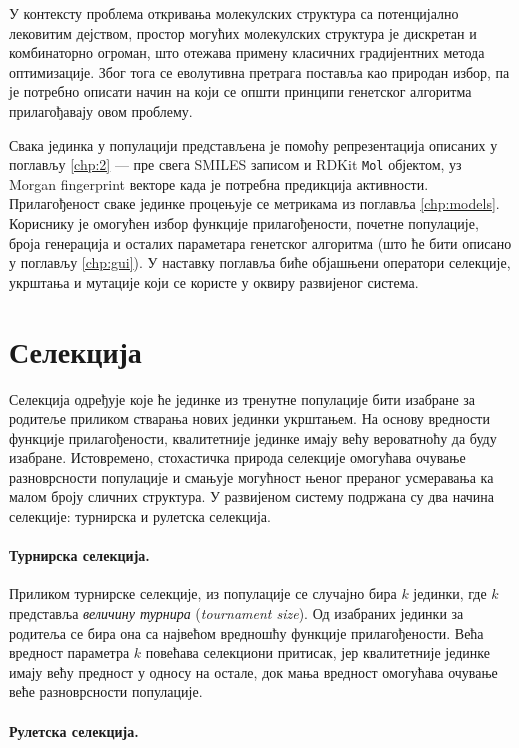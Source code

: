 \documentclass[12pt,oneside]{memoir}
\begin{document}
У контексту проблема откривања молекулских структура са потенцијално лековитим дејством, простор могућих молекулских структура је дискретан и комбинаторно огроман, што 
отежава примену класичних градијентних метода оптимизације. 
Због тога се еволутивна претрага поставља као природан избор, па је потребно
описати начин на који се општи принципи генетског алгоритма прилагођавају овом проблему. 

Свака јединка у популацији представљена је помоћу репрезентација описаних у поглављу \ref{chp:2} — пре свега SMILES записом 
и RDKit \texttt{Mol} објектом, уз Morgan fingerprint векторе када је потребна предикција активности.
Прилагођеност сваке јединке процењује се метрикама из поглавља \ref{chp:models}.
Кориснику је омогућен избор функције прилагођености, почетне популације, 
броја генерација и осталих параметара генетског алгоритма (што ће бити 
описано у поглављу \ref{chp:gui}).
У наставку поглавља биће објашњени оператори селекције, укрштања и мутације који се користе у оквиру  
развијеног система.

\section{Селекција}

Селекција одређује које ће јединке из тренутне популације бити изабране за 
родитеље приликом стварања нових јединки укрштањем. На основу вредности 
функције прилагођености, квалитетније јединке имају већу вероватноћу да буду 
изабране. Истовремено, стохастичка природа селекције омогућава очување 
разноврсности популације и смањује могућност њеног прераног усмеравања ка 
малом броју сличних структура.
У развијеном систему подржана су два начина селекције: турнирска и рулетска селекција. 

\paragraph{Турнирска селекција.}

Приликом турнирске селекције, из популације се случајно бира $k$ јединки, 
где $k$ представља \textit{величину турнира} (\textit{tournament size}). 
Од изабраних јединки за родитеља се бира она са највећом вредношћу функције 
прилагођености. Већа вредност параметра $k$ повећава селекциони притисак, 
јер квалитетније јединке имају већу предност у односу на остале, док мања 
вредност омогућава очување веће разноврсности популације.

\paragraph{Рулетска селекција.}
\end{document}
